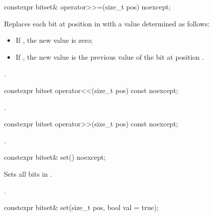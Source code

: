 %
\begin{itemdecl}
constexpr bitset& operator>>=(size_t pos) noexcept;
\end{itemdecl}

\begin{itemdescr}
\pnum
\effects
Replaces each bit at position  in
with a value determined as follows:

\begin{itemize}
\item
If , the new value is zero;
\item
If , the new value is the previous value of the bit at position .
\end{itemize}

\pnum
\returns
{}.
\end{itemdescr}

%
\begin{itemdecl}
constexpr bitset operator<<(size_t pos) const noexcept;
\end{itemdecl}

\begin{itemdescr}
\pnum
\returns
{}.
\end{itemdescr}

%
\begin{itemdecl}
constexpr bitset operator>>(size_t pos) const noexcept;
\end{itemdecl}

\begin{itemdescr}
\pnum
\returns
{}.
\end{itemdescr}

%
%
\begin{itemdecl}
constexpr bitset& set() noexcept;
\end{itemdecl}

\begin{itemdescr}
\pnum
\effects
Sets all bits in
.

\pnum
\returns
{}.
\end{itemdescr}

%
%
\begin{itemdecl}
constexpr bitset& set(size_t pos, bool val = true);
\end{itemdecl}

